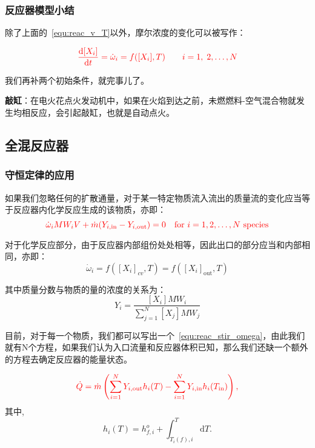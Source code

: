 \subsubsection{反应器模型小结}
除了上面的~\ref{equ:reac_v_T}以外，摩尔浓度的变化可以被写作：

\begin{equation}\color{red}
    {\frac{\mathrm{d}[X_{i}]}{\mathrm{d}t}}={\dot{\omega}}_{i}=f([X_{i}],T)\qquad i=1,\;2,\ldots,N
\end{equation}

我们再补两个初始条件，就完事儿了。

\textbf{敲缸}：在电火花点火发动机中，如果在火焰到达之前，未燃燃料-空气混合物就发生均相反应，会引起敲缸，也就是自动点火。

\subsection{全混反应器}
\subsubsection{守恒定律的应用}

如果我们忽略任何的扩散通量，对于某一特定物质流入流出的质量流的变化应当等于反应器内化学反应生成的该物质，亦即：
\begin{equation}\color{red}\label{equ:reac_stir_omega}
    \dot{\omega}_i MW_i V + \dot{m}(Y_{i, \mathrm{in}} - Y_{i, \mathrm{out}}) = 0\quad{\text{for }i=1,2,\ldots,N~\text{species}}
\end{equation}

对于化学反应部分，由于反应器内部组份处处相等，因此出口的部分应当和内部相同，亦即：
\begin{equation}
    \dot{\omega}_i = f([X_i]_{cv}, T) = f([X_i]_\mathrm{out}, T)
\end{equation}

其中质量分数与物质的量的浓度的关系为：
\begin{equation}
    Y_i = \frac{[X_i] MW_i}{\sum_{j=1}^N [X_j]MW_j}
\end{equation}

目前，对于每一个物质，我们都可以写出一个~\ref{equ:reac_stir_omega}，由此我们就有N个方程，如果我们认为入口流量和反应器体积已知，那么我们还缺一个额外的方程去确定反应器的能量状态。

\begin{equation}\color{red}
    \dot{Q}=\dot{m}\left(\sum_{i=1}^{N}Y_{i,\mathrm{out}}h_{i}(T)-\sum_{i=1}^{N}Y_{i,\mathrm{in}}h_{i}(T_{\mathrm{in}})\right),
\end{equation}其中,
\begin{equation}
    h_{i}(T)=h_{f,i}^{o}+\int_{T_{i}(f),i}^{T}\mathrm{d}T.
\end{equation}

